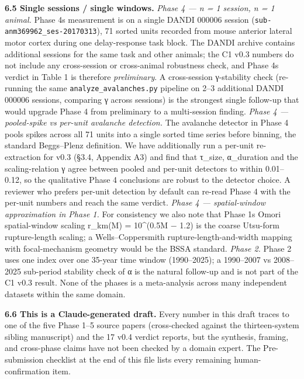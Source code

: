 \documentclass[
  11pt]{article}
\begin{document}
\textbf{6.5 Single sessions / single windows.} \emph{Phase 4 --- n = 1
session, n = 1 animal.} Phase 4\textquotesingle s measurement is on a
single DANDI 000006 session (\texttt{sub-anm369962\_ses-20170313}), 71
sorted units recorded from mouse anterior lateral motor cortex during
one delay-response task block. The DANDI archive contains additional
sessions for the same task and other animals; the C1 v0.3 numbers do not
include any cross-session or cross-animal robustness check, and Phase
4\textquotesingle s verdict in Table 1 is therefore \emph{preliminary}.
A cross-session γ-stability check (re-running the same
\texttt{analyze\_avalanches.py} pipeline on 2--3 additional DANDI 000006
sessions, comparing γ across sessions) is the strongest single follow-up
that would upgrade Phase 4 from preliminary to a multi-session finding.
\emph{Phase 4 --- pooled-spike vs per-unit avalanche detection.} The
avalanche detector in Phase 4 pools spikes across all 71 units into a
single sorted time series before binning, the standard Beggs--Plenz
definition. We have additionally run a per-unit re-extraction for v0.3
(§3.4, Appendix A3) and find that τ\_size, α\_duration and the
scaling-relation γ agree between pooled and per-unit detectors to within
0.01--0.12, so the qualitative Phase 4 conclusions are robust to the
detector choice. A reviewer who prefers per-unit detection by default
can re-read Phase 4 with the per-unit numbers and reach the same
verdict. \emph{Phase 4 --- spatial-window approximation in Phase 1.} For
consistency we also note that Phase 1\textquotesingle s Omori
spatial-window scaling r\_km(M) = 10\^{}(0.5M − 1.2) is the coarse
Utsu-form rupture-length scaling; a Wells--Coppersmith
rupture-length-and-width mapping with focal-mechanism geometry would be
the BSSA standard. \emph{Phase 2.} Phase 2 uses one index over one
35-year time window (1990--2025); a 1990--2007 vs 2008--2025 sub-period
stability check of α is the natural follow-up and is not part of the C1
v0.3 result. None of the phases is a meta-analysis across many
independent datasets within the same domain.

\textbf{6.6 This is a Claude-generated draft.} Every number in this
draft traces to one of the five Phase 1--5 source papers (cross-checked
against the thirteen-system sibling manuscript) and the 17 v0.4 verdict
reports, but the synthesis, framing, and cross-phase claims have not
been checked by a domain expert. The Pre-submission checklist at the end
of this file lists every remaining human-confirmation item.
\end{document}
